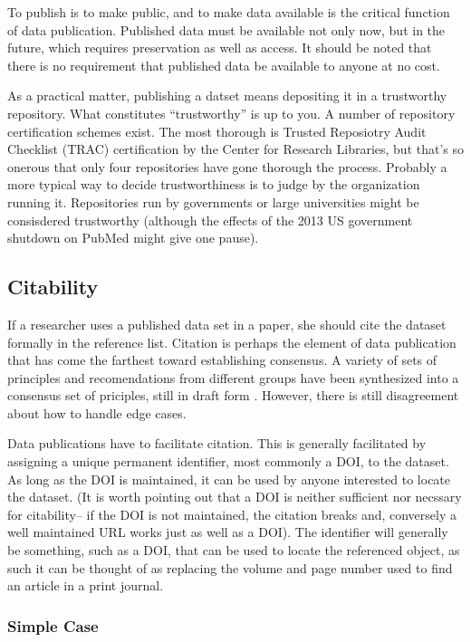 \documentclass[10pt,a4paper,twocolumn]{article}
\begin{document}
To publish is to make public, and to make data available is the critical function of data publication. 
Published data must be available not only now, but in the future, which requires preservation as well as access. 
It should be noted that there is no requirement that published data be available to anyone at no cost.

As a practical matter, publishing a datset means depositing it in a trustworthy repository. 
What constitutes ``trustworthy'' is up to you. 
A number of repository certification schemes exist. The most thorough is Trusted Reposiotry Audit Checklist (TRAC)\cite{trac_2007} certification by the Center for Research Libraries, but that's so onerous that only four repositories have gone thorough the process. 
Probably a more typical way to decide trustworthiness is to judge by the organization running it. 
Repositories run by governments or large universities might be consisdered trustworthy (although the effects of the 2013 US government shutdown on PubMed might give one pause).

\subsection*{Citability}\label{citability}

If a researcher uses a published data set in a paper, she should cite the dataset formally in the reference list. 
Citation is perhaps the element of data publication that has come the farthest toward establishing consensus.
A variety of sets of principles and recomendations from different groups have been synthesized into a consensus set of priciples, still in draft form \cite{force11_data_2013}. 
However, there is still disagreement about how to handle edge cases.

Data publications have to facilitate citation. 
This is generally facilitated by assigning a unique permanent identifier, most commonly a DOI, to the dataset. 
As long as the DOI is maintained, it can be used by anyone interested to locate the dataset. 
(It is worth pointing out that a DOI is neither sufficient nor necssary for citability-- if the DOI is not maintained, the citation breaks and, conversely a well maintained URL works just as well as a DOI). 
The identifier will generally be something, such as a DOI, that can be used to locate the referenced object, as such it can be thought of as replacing the volume and page number used to find an article in a print journal.

\subsubsection{Simple Case}\label{simple-case}
\end{document}
